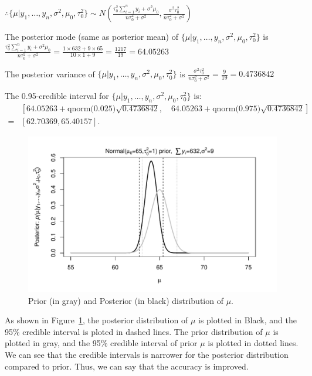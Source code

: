 \documentclass[11pt]{article}
\begin{document}
$\therefore \{\mu|y_1,\ldots,y_n, \sigma^2, \mu_0, \tau_0^2\} \sim N(\frac{ \tau_0^2 \sum_{i=1}^{n} y_i + \sigma^2\mu_0 }{n\tau_0^2+\sigma^2}, \frac{\sigma^2\tau_0^2}{n\tau_0^2+\sigma^2})$

The posterior mode (same as posterior mean) of $\{\mu|y_1,\ldots,y_n, \sigma^2, \mu_0, \tau_0^2\}$ is $\frac{ \tau_0^2 \sum_{i=1}^{n} y_i + \sigma^2\mu_0 }{n\tau_0^2+\sigma^2} = \frac{1\times632+9\times 65}{10\times 1+9} = \frac{1217}{19} = 64.05263$

The posterior variance of $\{\mu|y_1,\ldots,y_n, \sigma^2, \mu_0, \tau_0^2\}$ is $\frac{\sigma^2\tau_0^2}{n\tau_0^2+\sigma^2} = \frac{9}{19} = 0.4736842$ 

The 0.95-credible interval for $\{\mu|y_1,\ldots,y_n, \sigma^2, \mu_0, \tau_0^2\}$ is:
\begin{align*}
&[64.05263+\text{qnorm(0.025)}\sqrt{0.4736842}, \quad 64.05263+\text{qnorm(0.975)}\sqrt{0.4736842} ] \\
=& [62.70369, 65.40157]
.\end{align*}

\begin{figure}[htpb]
	\centering
	\includegraphics[width=\textwidth]{Ast3-Q3.pdf}
	\caption{Prior (in gray) and Posterior (in black) distribution of $\mu$.}
	\label{fig:Ast3-Q3-pdf}
\end{figure}

As shown in Figure~\ref{fig:Ast3-Q3-pdf}, the posterior distribution of $\mu$ is plotted in Black, and the 95\% credible interval is ploted in dashed lines. The prior distribution of $\mu$ is plotted in gray, and the 95\% credible interval of prior $\mu$ is plotted in dotted lines. We can see that the credible intervals is narrower for the posterior distribution compared to prior. Thus, we can say that the accuracy is improved.
\end{document}
